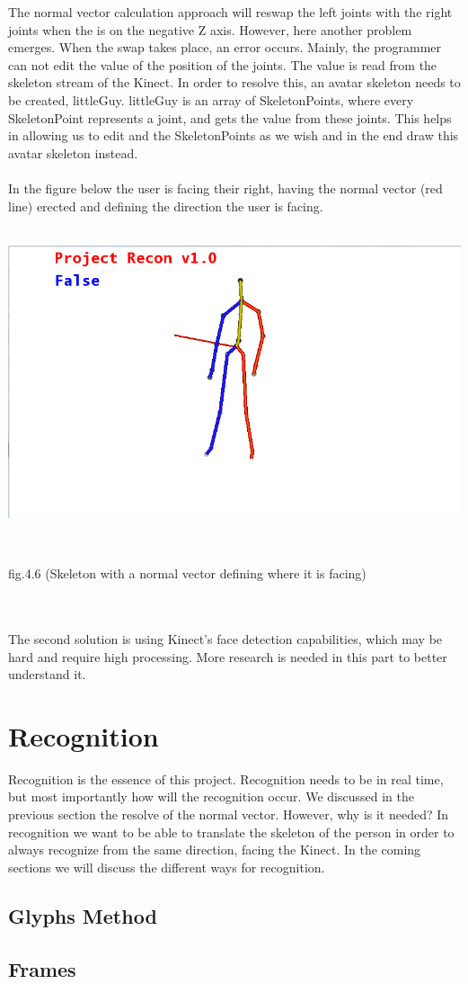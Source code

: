 
The normal vector calculation approach will reswap the left joints with the right joints when the \N is on the negative Z axis. 
However, here another problem emerges. When the swap takes place, an error occurs. Mainly, the programmer can not 
edit the value of the position of the joints. The value is read from the skeleton 
stream of the Kinect. In order to resolve this, an avatar skeleton needs to be 
created, littleGuy. littleGuy is an array of SkeletonPoints, where every 
SkeletonPoint represents a joint, and gets the value from these joints. This 
helps in allowing us to edit and the SkeletonPoints as we wish and in the end 
draw this avatar skeleton instead.
\\
\\
In the figure below the user is facing their right, having the normal vector (red 
line) erected and defining the direction the user is facing.
\\
\\
\centerline{\includegraphics[scale=0.5]{skeleton_normal.png}}
\\
\centerline{fig.4.6 (Skeleton with a normal vector defining where it is facing)}
\\
\\
The second solution is using Kinect's face detection capabilities, which may be 
hard and require high processing. More research is needed in this part to better 
understand it.
\section{Recognition}
Recognition is the essence of this project. Recognition needs to be in real time, but most importantly how will the recognition occur. We discussed in the previous section the resolve of the normal vector. However, why is it needed? In recognition we want to be able to translate the skeleton of the person in order to always recognize from the same direction, facing the Kinect. In the coming sections we will discuss the different ways for recognition.
\subsection{Glyphs Method}
\subsection{Frames}